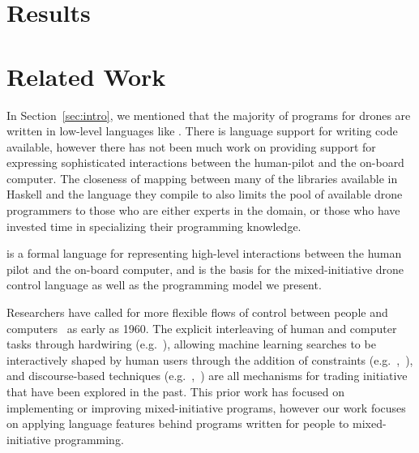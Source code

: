 \documentclass{sig-alternate-05-2015}
\begin{document}

\section{Results}
\label{sec:results}


\section{Related Work}
\label{sec:related}

In Section~\ref{sec:intro}, we mentioned that the majority of programs for
drones are written in low-level languages like . There is language
support for writing  code available, however there has not been
much work on providing support for expressing sophisticated interactions
between the human-pilot and the on-board computer. The closeness of mapping
between many of the libraries available in Haskell and the  language
they compile to also limits the pool of available drone programmers to those
who are either experts in the domain, or those who have invested time in
specializing their programming knowledge.

 is a formal language for
representing high-level interactions between the human pilot and the on-board
computer, and is the basis for the mixed-initiative drone control language as
well as the programming model we present.

Researchers have called for more flexible flows of control between people and
computers~\cite{L60symbiosis} as early as 1960. The explicit interleaving
of human and computer tasks through hardwiring (e.g.~\cite{LHML08cosripter}),
allowing machine learning searches to be interactively shaped by human users
through the addition of constraints
(e.g.~\cite{LMRS04symbiosis},~\cite{Kea11why}), and discourse-based techniques
(e.g.~\cite{SRL01collagen},~\cite{ML92explanatory}) are all mechanisms for
trading initiative that have been explored in the past. This prior work has
focused on implementing or improving mixed-initiative programs, however our
work focuses on applying language features behind programs written for people
to mixed-initiative programming.
\end{document}
